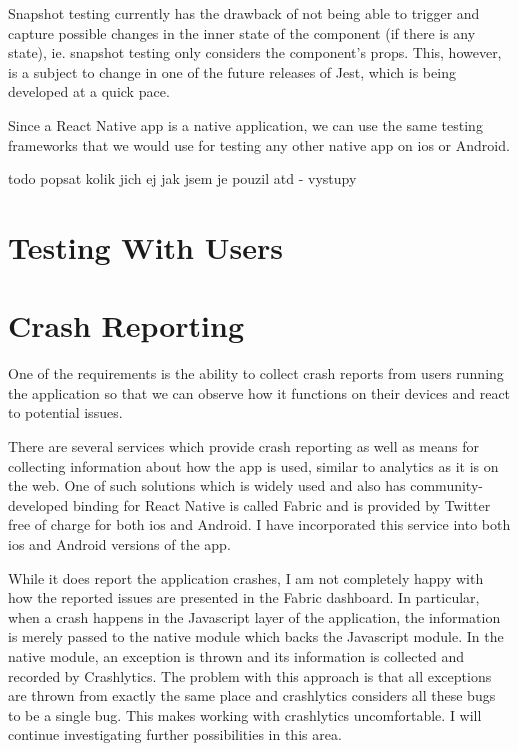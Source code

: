 Snapshot testing currently has the drawback of not being able to trigger and capture possible changes in the inner state of the component (if there is any state), ie. snapshot testing only considers the component’s props. This, however, is a subject to change in one of the future releases of Jest, which is being developed at a quick pace.

Since a React Native app is a native application, we can use the same testing frameworks that we would use for testing any other native app on ios or Android. 

todo popsat kolik jich ej jak jsem je pouzil atd - vystupy

\section{Testing With Users}



\section{Crash Reporting}


One of the requirements is the ability to collect crash reports from users running the application so that we can observe how it functions on their devices and react to potential issues. 

There are several services which provide crash reporting as well as means for collecting information about how the app is used, similar to analytics as it is on the web. One of such solutions which is widely used and also has community-developed binding for React Native is called Fabric and is provided by Twitter free of charge for both ios and Android. I have incorporated this service into both ios and Android versions of the app. 

While it does report the application crashes, I am not completely happy with how the reported issues are presented in the Fabric dashboard. In particular, when a crash happens in the Javascript layer of the application, the information is merely passed to the native module which backs the Javascript module. In the native module, an exception is thrown and its information is collected and recorded by Crashlytics. The problem with this approach is that all exceptions are thrown from exactly the same place and crashlytics considers all these bugs to be a single bug. This makes working with crashlytics uncomfortable. I will continue investigating further possibilities in this area. 